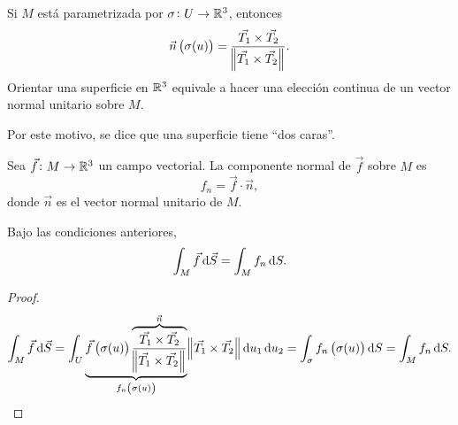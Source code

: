 \begin{obs}
    Si $M$ está parametrizada por $\sigma \colon U \to \mathbb{R}^3$, entonces
    \[
        \vec{n} \left( \sigma(u) \right) = \frac{\vec{T_1} \times \vec{T_2}}{\norm{\vec{T_1} \times \vec{T_2}}}.
    \]
    Orientar una superficie en $\mathbb{R}^3$ equivale a hacer una elección continua de un vector normal unitario sobre $M$.

    Por este motivo, se dice que una superficie tiene ``dos caras''.
\end{obs}

\begin{defi}
    Sea $\vec{f} \colon M \to \mathbb{R}^3$ un campo vectorial. La componente normal de $\vec{f}$ sobre $M$ es 
    \[
        f_n = \vec{f} \cdot \vec{n},
    \]
    donde $\vec{n}$ es el vector normal unitario de $M$.
\end{defi}

\begin{prop}
    Bajo las condiciones anteriores,
    \[
        \int_M \vec{f} \dif \vec{S} = \int_M f_n \dif S.
    \]
\end{prop}

\begin{proof}
    \[
        \int_M \vec{f} \dif \vec{S} = \int_U \underbrace{\vec{f}\left( \sigma(u) \right) \overbrace{\frac{\vec{T_1} \times \vec{T_2}}{\norm{\vec{T_1} \times \vec{T_2}}}}^
        {\vec{n}}}_{f_n\left( \sigma(u) \right)} \norm{\vec{T_1} \times \vec{T_2}} \dif u_1 \dif u_2 = \int_\sigma f_n\left( \sigma(u) \right) \dif S =
        \int_M f_n \dif S.
    \]
\end{proof}

